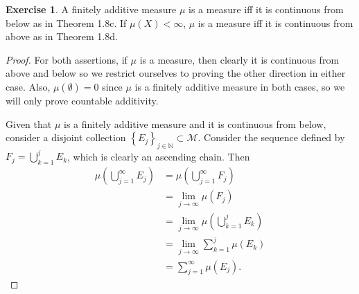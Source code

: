 \documentclass{article}
\theoremstyle{definition}
\newtheorem{ex}{Exercise}
\begin{document}
\begin{ex}
	A finitely additive measure $\mu$ is a measure iff it is continuous from below as in Theorem 1.8c.
	If $\mu(X) < \infty$, $\mu$ is a measure iff it is continuous from above as in Theorem 1.8d.
\end{ex}
\begin{proof}
	For both assertions, if $\mu$ is a measure, then clearly it is continuous from above and below so we restrict ourselves to proving the other direction in either case.
	Also, $\mu(\emptyset) = 0$ since $\mu$ is a finitely additive measure in both cases, so we will only prove countable additivity.

	Given that $\mu$ is a finitely additive measure and it is continuous from below, consider a disjoint collection $\left\lbrace E_j \right\rbrace_{j \in \mathbb{N}} \subset \mathscr{M}$.
	Consider the sequence defined by $F_j = \bigcup _{k = 1}^{j} E_k$, which is clearly an ascending chain.
	Then \begin{align*}
		\mu \left( \bigcup _{j = 1}^{\infty}E_j \right) & = \mu \left( \bigcup _{j = 1}^{\infty} F_j \right)                \\
		                                                & = \lim_{j \to \infty} \mu(F_j)                                    \\
		                                                & = \lim_{j \to \infty} \mu \left( \bigcup _{k = 1}^{j} E_k \right) \\
		                                                & = \lim_{j \to \infty} \sum _{k = 1}^{j} \mu(E_k)                  \\
		                                                & = \sum _{j = 1}^{\infty} \mu \left( E_j \right).
	\end{align*}


\end{proof}
\end{document}

